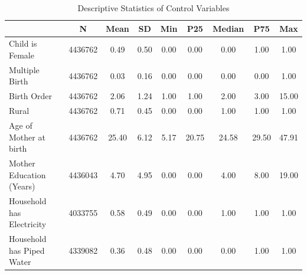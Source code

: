 \begin{table}[h]
\caption{Descriptive Statistics of Control Variables}
\label{tab:summary_stats}
\begin{tabular}{lcccccccc}
\toprule
 & N & Mean & SD & Min & P25 & Median & P75 & Max \\ 
\midrule
Child is Female & 4436762 & 0.49 & 0.50 & 0.00 & 0.00 & 0.00 & 1.00 & 1.00 \\
Multiple Birth & 4436762 & 0.03 & 0.16 & 0.00 & 0.00 & 0.00 & 0.00 & 1.00 \\
Birth Order & 4436762 & 2.06 & 1.24 & 1.00 & 1.00 & 2.00 & 3.00 & 15.00 \\
Rural & 4436762 & 0.71 & 0.45 & 0.00 & 0.00 & 1.00 & 1.00 & 1.00 \\
Age of Mother at birth & 4436762 & 25.40 & 6.12 & 5.17 & 20.75 & 24.58 & 29.50 & 47.91 \\
Mother Education (Years) & 4436043 & 4.70 & 4.95 & 0.00 & 0.00 & 4.00 & 8.00 & 19.00 \\
Household has Electricity & 4033755 & 0.58 & 0.49 & 0.00 & 0.00 & 1.00 & 1.00 & 1.00 \\
Household has Piped Water & 4339082 & 0.36 & 0.48 & 0.00 & 0.00 & 0.00 & 1.00 & 1.00 \\
\bottomrule
\end{tabular}
\end{table}
